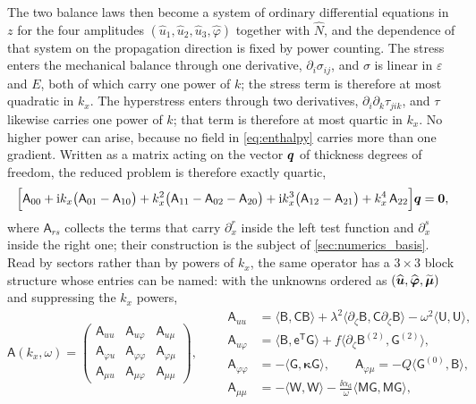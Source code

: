 The two balance laws then become a system of ordinary differential equations in
$z$ for the four amplitudes $(\widehat u_1,\widehat u_2,\widehat u_3,
\widehat\varphi)$ together with $\widehat N$, and the dependence of that system
on the propagation direction is fixed by power counting.  The stress enters the
mechanical balance through one derivative, $\partial_i\sigma_{ij}$, and $\sigma$
is linear in $\varepsilon$ and $E$, both of which carry one power of $k$; the
stress term is therefore at most quadratic in $k_x$.  The hyperstress enters
through two derivatives, $\partial_i\partial_k\tau_{jik}$, and $\tau$ likewise
carries one power of $k$; that term is therefore at most quartic in $k_x$.  No
higher power can arise, because no field in \eqref{eq:enthalpy} carries more than
one gradient.  Written as a matrix acting on the vector $\boldsymbol{q}$ of thickness
degrees of freedom, the reduced problem is therefore exactly quartic,
\begin{equation}
\label{eq:quartic}
\Bigl[\mathsf A_{00}
+\mathrm{i} k_x\bigl(\mathsf A_{01}-\mathsf A_{10}\bigr)
+k_x^{2}\bigl(\mathsf A_{11}-\mathsf A_{02}-\mathsf A_{20}\bigr)
+\mathrm{i} k_x^{3}\bigl(\mathsf A_{12}-\mathsf A_{21}\bigr)
+k_x^{4}\,\mathsf A_{22}\Bigr]\boldsymbol{q}=\boldsymbol{0} ,
\end{equation}
where $\mathsf A_{rs}$ collects the terms that carry $\partial_x^{r}$ inside the
left test function and $\partial_x^{s}$ inside the right one; their construction
is the subject of \cref{sec:numerics_basis}.  Read by sectors rather than by powers of $k_x$, the same operator has a
$3\times3$ block structure whose entries can be named: with the unknowns ordered
as $(\widehat{\boldsymbol{u}},\widehat{\boldsymbol\varphi},\widetilde{\boldsymbol\mu})$
and suppressing the $k_x$ powers,
\begin{equation}
\label{eq:sector_blocks}
\mathsf A(k_x,\omega)=
\begin{pmatrix}
\mathsf A_{uu} & \mathsf A_{u\varphi} & \mathsf A_{u\mu}\\[2pt]
\mathsf A_{\varphi u} & \mathsf A_{\varphi\varphi} & \mathsf A_{\varphi\mu}\\[2pt]
\mathsf A_{\mu u} & \mathsf A_{\mu\varphi} & \mathsf A_{\mu\mu}
\end{pmatrix},
\qquad
\begin{aligned}
\mathsf A_{uu}&=\langle\mathsf B,\mathsf C\mathsf B\rangle
+\lambda^{2}\langle\partial_\zeta\mathsf B,\mathsf C\partial_\zeta\mathsf B\rangle
-\omega^{2}\langle\mathsf U,\mathsf U\rangle,\\
\mathsf A_{u\varphi}&=\langle\mathsf B,\mathsf e^{\mathsf T}\mathsf G\rangle
+f\langle\partial_\zeta\mathsf B^{(2)},\mathsf G^{(2)}\rangle,\\
\mathsf A_{\varphi\varphi}&=-\langle\mathsf G,\boldsymbol\kappa\mathsf G\rangle,\qquad
\mathsf A_{\varphi\mu}=-Q\langle\mathsf G^{(0)},\mathsf B\rangle,\\
\mathsf A_{\mu\mu}&=-\langle\mathsf W,\mathsf W\rangle
-\frac{\ii\alpha_{\mathrm d}}{\omega}\langle\mathsf M\mathsf G,\mathsf M\mathsf G\rangle,
\end{aligned}
\end{equation}
